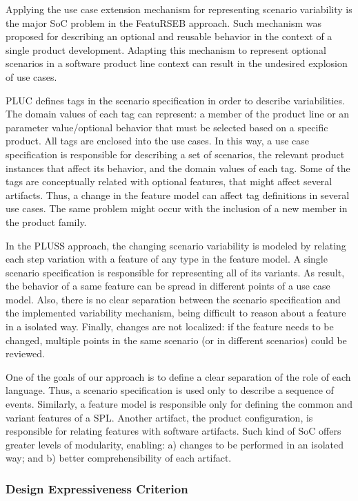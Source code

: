 Applying the use case extension mechanism for representing scenario
variability is the major SoC problem in the FeatuRSEB approach. Such
mechanism was proposed for describing an optional and reusable behavior in
the context of a single product development. Adapting this mechanism to represent
optional scenarios in a software product line context can result in the undesired
explosion of use cases.

PLUC defines tags in the scenario specification in order to describe
variabilities. The domain values of each tag can represent: a member
of the product line or an parameter value/optional behavior that
must be selected based on a specific product. All tags are enclosed
into the use cases. In this way, a use case specification is
responsible for describing a set of scenarios, the relevant product
instances that affect its behavior, and the domain values of each
tag. Some of the tags are conceptually related with optional
features, that might affect several artifacts. Thus, a change in the
feature model can affect tag definitions in several use cases. The
same problem might occur with the inclusion of a new member in the
product family.

In the PLUSS approach, the changing scenario variability is modeled
by relating each step variation with a feature of any type in the
feature model. A single scenario specification is responsible for
representing all of its variants. As result, the behavior of a same
feature can be spread in different points of a use case model. Also,
there is no clear separation between the scenario specification and
the implemented variability mechanism, being difficult to reason
about a feature in a isolated way. Finally, changes are not
localized: if the feature needs to be changed, multiple points in
the same scenario (or in different scenarios) could be reviewed.

One of the goals of our approach is to define a clear separation of
the role of each language. Thus, a scenario specification
is used only to describe a sequence of events. Similarly, a feature
model is responsible only for defining the common and
variant features of a SPL. Another artifact, the product
configuration, is responsible for relating features with software
artifacts. Such kind of SoC offers greater levels of modularity,
enabling: a) changes to be performed in an isolated way; and b)
better comprehensibility of each artifact.

\subsubsection{Design Expressiveness Criterion}

